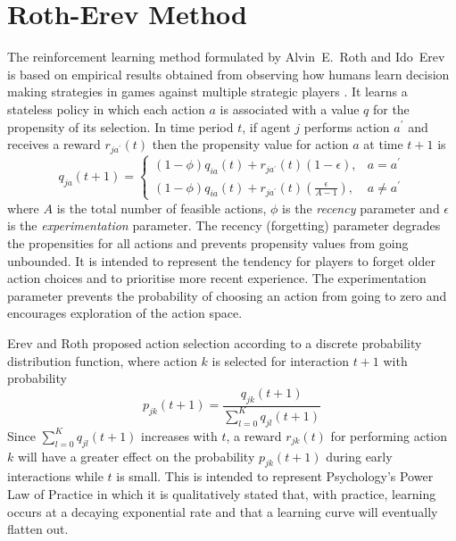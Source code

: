 \section{Roth-Erev Method}
\label{sec:rotherev}
The reinforcement learning method formulated by Alvin~E.~Roth and Ido~Erev is
based on empirical results obtained from observing how humans learn decision
making strategies in games against multiple strategic players
\cite{roth:games,roth:aer}.  It learns a stateless policy in which each action
$a$ is associated with a value $q$ for the propensity of its selection.  In
time period $t$, if agent $j$ performs action $a^\prime$ and receives a reward
$r_{ja^\prime}(t)$ then the propensity value for action $a$ at time $t+1$ is
\begin{equation}
q_{ja}(t+1) =
\begin{cases}
(1-\phi)q_{ia}(t) + r_{ja^\prime}(t)(1-\epsilon), & \text{$a = a^\prime$} \\
(1-\phi)q_{ia}(t) + r_{ja^\prime}(t)(\frac{\epsilon}{A-1}), & \text{$a \ne
a^\prime$}
\end{cases}
\end{equation}
where $A$ is the total number of feasible actions, $\phi$ is the
\textit{recency} parameter and $\epsilon$ is the \textit{experimentation} parameter.  The recency (forgetting) parameter
degrades the propensities for all actions and prevents propensity values from
going unbounded.  It is intended to represent the tendency for players to forget
older action choices and to prioritise more recent experience.  The
experimentation parameter prevents the probability of choosing an action from
going to zero and encourages exploration of the action space.

Erev and Roth proposed action selection according to a discrete probability
distribution function, where action $k$ is selected for interaction $t+1$ with
probability
\begin{equation}
\label{eq:re_prob}
p_{jk}(t+1) = \frac{q_{jk}(t+1)}{\sum_{l=0}^K q_{jl}(t+1)}
\end{equation}
Since $\sum_{l=0}^K q_{jl}(t+1)$ increases with $t$, a reward $r_{jk}(t)$ for
performing action $k$ will have a greater effect on the probability
$p_{jk}(t+1)$ during early interactions while $t$ is small.  This is intended
to represent Psychology's Power Law of Practice in which it is qualitatively
stated that, with practice, learning occurs at a decaying exponential rate and
that a learning curve will eventually flatten out.


